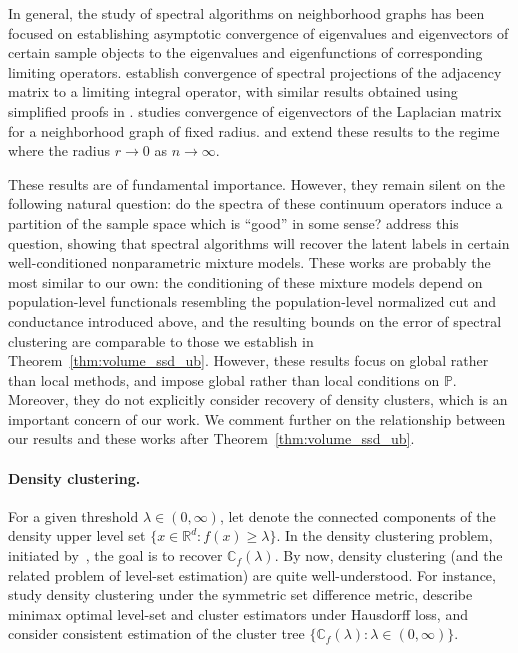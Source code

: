 \documentclass[11pt,twoside]{article}
\theoremstyle{definition}
\newcommand{\Reals}{\mathbb{R}}
\newcommand{\1}{\mathbf{1}}
\newcommand{\Rd}{\Reals^d}
\newcommand{\Pbb}{\mathbb{P}}
\begin{document}
In general, the study of spectral algorithms on neighborhood graphs has been
focused on establishing asymptotic convergence of eigenvalues and eigenvectors
of certain sample objects to the eigenvalues and eigenfunctions of corresponding
limiting operators. \citet{koltchinskii2000} establish convergence of spectral
projections of the adjacency matrix to a limiting integral operator, with
similar results obtained using simplified proofs in
\citet{rosasco10}. \citet{vonluxburg2008} studies convergence of eigenvectors of
the Laplacian matrix for a neighborhood graph of fixed radius. \citet{belkin07} and
\citet{garciatrillos18} extend these results to the regime where the radius $r
\to 0$ as $n \to \infty$. 

These results are of fundamental importance. However, they remain silent on the following natural question: do the spectra of these continuum operators induce a partition of the sample space which is ``good'' in some sense? \citet{shi2009,schiebinger2015,garciatrillos19,hoffmann2019} address this question, showing that spectral algorithms will recover the latent labels in certain well-conditioned nonparametric mixture models. These works are probably the most similar to our own: the conditioning of these mixture models depend on population-level functionals resembling the population-level normalized cut and conductance introduced above, and the resulting bounds on the error of spectral clustering are comparable to those we establish in Theorem~\ref{thm:volume_ssd_ub}. However, these results focus on global rather than local methods, and impose global rather than local conditions on $\Pbb$. Moreover, they do not explicitly consider recovery of density clusters, which is an important concern of our work. We comment further on the relationship between our results and these works after Theorem~\ref{thm:volume_ssd_ub}.

\paragraph{Density clustering.} For a given threshold $\lambda \in (0,\infty)$, let  denote the connected components of the density upper level set $\{x \in \Rd: f(x) \geq \lambda\}$. In the density clustering problem, initiated by~\cite{hartigan1975}, the goal is to recover $\mathbb{C}_{f}(\lambda)$. By now, density clustering (and the related problem of level-set estimation) are quite well-understood. For instance, \citet{polonik1995,rigollet2009, rinaldo2010, steinwart2015} study density clustering under the symmetric set difference
metric, \citet{tsybakov1997,singh2009,jiang2017} describe minimax optimal level-set and cluster estimators under Hausdorff loss, and
\citet{hartigan1981,chaudhuri2010,kpotufe11,balakrishnan2013,steinwart2017,wang2019} consider
consistent estimation of the cluster tree $\{\mathbb{C}_f(\lambda): \lambda \in (0,\infty)\}$.
\end{document}
